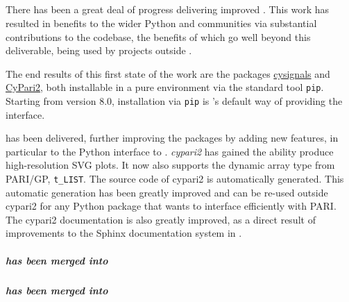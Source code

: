 \subparagraph{}
\label{UI@pari-python}


There has been a great deal of progress delivering improved \Pari.
This work has resulted in benefits to the wider Python and \Sage communities
via substantial contributions to the \Sage codebase,
the benefits of which go well beyond this deliverable,
being used by projects outside \ODK.

The end results of this first state of the work are the packages
\href{https://github.com/sagemath/cysignals}{cysignals} and
\href{https://github.com/defeo/cypari2}{CyPari2}, both installable
in a pure \Python environment via the standard tool
\texttt{pip}. Starting from version 8.0, installation via \texttt{pip}
is \Sage's default way of providing the \Pari interface.

 has been delivered, further improving the \Pari packages
by adding new features, in particular to the Python interface to \Pari.
\emph{cypari2} has gained the ability produce high-resolution SVG plots.
It now also supports the dynamic array type from PARI/GP, \verb/t_LIST/.
The source code of cypari2 is automatically generated.
This automatic generation has been greatly improved
and can be re-used outside cypari2 for any Python package that wants to interface efficiently with PARI.
The cypari2 documentation is also greatly improved,
as a direct result of improvements to the Sphinx documentation system
in .

\subparagraph{
  has been merged into
}
\label{UI@oommf-tutorial-and-documentation}

\subparagraph{
  has been merged into
}
\label{UI@oommf-nb-ve}


